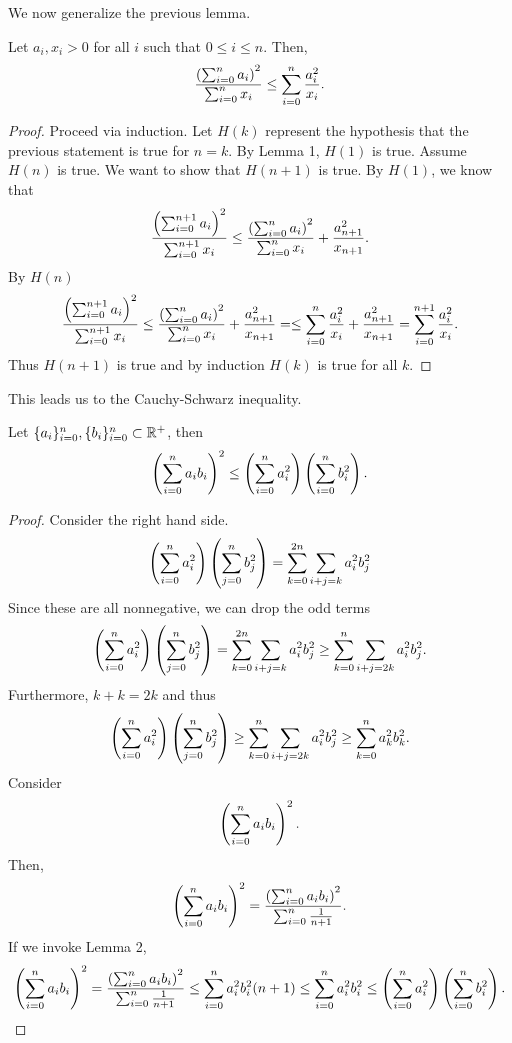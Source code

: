 \documentclass[notitlepage]{simple}
\begin{document}
	We now generalize the previous lemma.
	\begin{lemma}
		Let $a_i,x_i>0$ for all $i$ such that $0\leq i\leq n$.
		Then,
		\[
			\frac{\left( \sum_{i=0}^na_i \right)^2}{\sum_{i=0}^n x_i}\leq \sum_{i=0}^n\frac{a_i^2}{x_i}.
		\]
	\end{lemma}
	\begin{proof}
		Proceed via induction.
		Let $H(k)$ represent the hypothesis that the previous statement is true for $n=k$.
		By Lemma 1, $H(1)$ is true.
		Assume $H(n)$ is true.
		We want to show that $H(n+1)$ is true.
		By $H(1)$, we know that
		\[
			\frac{\left( \sum_{i=0}^{n+1}a_i \right)^2}{\sum_{i=0}^{n+1} x_i}
			\leq \frac{\left( \sum_{i=0}^na_i \right)^2}{\sum_{i=0}^n x_i}+\frac{a_{n+1}^2}{x_{n+1}}.
		\]
		By $H(n)$
		\[
			\frac{\left( \sum_{i=0}^{n+1}a_i \right)^2}{\sum_{i=0}^{n+1} x_i}
			\leq \frac{\left( \sum_{i=0}^na_i \right)^2}{\sum_{i=0}^n x_i}+\frac{a_{n+1}^2}{x_{n+1}}=
			\leq \sum_{i=0}^n\frac{a_i^2}{x_i}+\frac{a_{n+1}^2}{x_{n+1}}
			=\sum_{i=0}^{n+1}\frac{a_i^2}{x_i}.
		\]
		Thus $H(n+1)$ is true and by induction $H(k)$ is true for all $k$.
	\end{proof}
	This leads us to the Cauchy-Schwarz inequality.
	\begin{thm}
		Let $\lbrace a_i \rbrace_{i=0}^n,\lbrace b_i \rbrace_{i=0}^n\subset\mathbb{R}^+$, then
		\[
			\left( \sum_{i=0}^n a_ib_i \right)^2 \leq \left( \sum_{i=0}^n a_i^2 \right)\left( \sum_{i=0}^n b_i^2 \right).
		\]
	\end{thm}
	\begin{proof}
		Consider the right hand side.
		\[
			\left( \sum_{i=0}^n a_i^2 \right)\left( \sum_{j=0}^n b_j^2 \right)=\sum_{k=0}^{2n}\sum_{i+j=k}a_i^2b_j^2
		\]
		Since these are all nonnegative, we can drop the odd terms
		\[
			\left( \sum_{i=0}^n a_i^2 \right)\left( \sum_{j=0}^n b_j^2 \right)
			=\sum_{k=0}^{2n}\sum_{i+j=k}a_i^2b_j^2
			\geq \sum_{k=0}^{n}\sum_{i+j=2k}a_i^2b_j^2.
		\]
		Furthermore, $k+k=2k$ and thus
		\[
			\left( \sum_{i=0}^n a_i^2 \right)\left( \sum_{j=0}^n b_j^2 \right)
			\geq \sum_{k=0}^{n}\sum_{i+j=2k}a_i^2b_j^2
			\geq \sum_{k=0}^{n}a_k^2b_k^2.
		\]
		Consider
		\[
			\left( \sum_{i=0}^n a_ib_i \right)^2.
		\]
		Then,
		\[
			\left( \sum_{i=0}^n a_ib_i \right)^2
			= \frac{\left( \sum_{i=0}^n a_ib_i \right)^2}{\sum_{i=0}^n\frac{1}{n+1}}.
		\]
		If we invoke Lemma 2,
		\[
			\left( \sum_{i=0}^n a_ib_i \right)^2
			= \frac{\left( \sum_{i=0}^n a_ib_i \right)^2}{\sum_{i=0}^n\frac{1}{n+1}}
			\leq \sum_{i=0}^n a_i^2b_i^2(n+1)
			\leq \sum_{i=0}^n a_i^2b_i^2
			\leq\left( \sum_{i=0}^n a_i^2 \right)\left( \sum_{i=0}^n b_i^2 \right).
		\]
	\end{proof}
\end{document}
